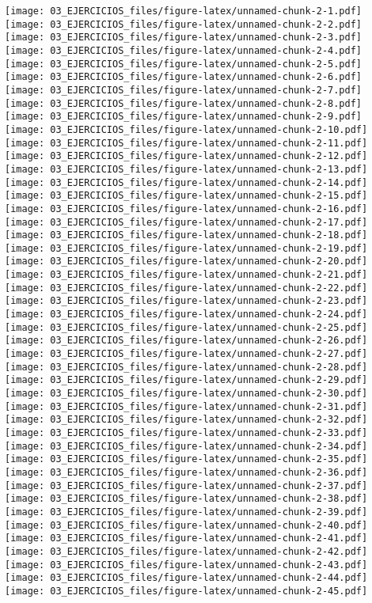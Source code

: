 \documentclass[
]{book}
\begin{document}
\texttt{[image: 03\_EJERCICIOS\_files/figure-latex/unnamed-chunk-2-1.pdf]} \texttt{[image: 03\_EJERCICIOS\_files/figure-latex/unnamed-chunk-2-2.pdf]} \texttt{[image: 03\_EJERCICIOS\_files/figure-latex/unnamed-chunk-2-3.pdf]} \texttt{[image: 03\_EJERCICIOS\_files/figure-latex/unnamed-chunk-2-4.pdf]} \texttt{[image: 03\_EJERCICIOS\_files/figure-latex/unnamed-chunk-2-5.pdf]} \texttt{[image: 03\_EJERCICIOS\_files/figure-latex/unnamed-chunk-2-6.pdf]} \texttt{[image: 03\_EJERCICIOS\_files/figure-latex/unnamed-chunk-2-7.pdf]} \texttt{[image: 03\_EJERCICIOS\_files/figure-latex/unnamed-chunk-2-8.pdf]} \texttt{[image: 03\_EJERCICIOS\_files/figure-latex/unnamed-chunk-2-9.pdf]} \texttt{[image: 03\_EJERCICIOS\_files/figure-latex/unnamed-chunk-2-10.pdf]} \texttt{[image: 03\_EJERCICIOS\_files/figure-latex/unnamed-chunk-2-11.pdf]} \texttt{[image: 03\_EJERCICIOS\_files/figure-latex/unnamed-chunk-2-12.pdf]} \texttt{[image: 03\_EJERCICIOS\_files/figure-latex/unnamed-chunk-2-13.pdf]} \texttt{[image: 03\_EJERCICIOS\_files/figure-latex/unnamed-chunk-2-14.pdf]} \texttt{[image: 03\_EJERCICIOS\_files/figure-latex/unnamed-chunk-2-15.pdf]} \texttt{[image: 03\_EJERCICIOS\_files/figure-latex/unnamed-chunk-2-16.pdf]} \texttt{[image: 03\_EJERCICIOS\_files/figure-latex/unnamed-chunk-2-17.pdf]} \texttt{[image: 03\_EJERCICIOS\_files/figure-latex/unnamed-chunk-2-18.pdf]} \texttt{[image: 03\_EJERCICIOS\_files/figure-latex/unnamed-chunk-2-19.pdf]} \texttt{[image: 03\_EJERCICIOS\_files/figure-latex/unnamed-chunk-2-20.pdf]} \texttt{[image: 03\_EJERCICIOS\_files/figure-latex/unnamed-chunk-2-21.pdf]} \texttt{[image: 03\_EJERCICIOS\_files/figure-latex/unnamed-chunk-2-22.pdf]} \texttt{[image: 03\_EJERCICIOS\_files/figure-latex/unnamed-chunk-2-23.pdf]} \texttt{[image: 03\_EJERCICIOS\_files/figure-latex/unnamed-chunk-2-24.pdf]} \texttt{[image: 03\_EJERCICIOS\_files/figure-latex/unnamed-chunk-2-25.pdf]} \texttt{[image: 03\_EJERCICIOS\_files/figure-latex/unnamed-chunk-2-26.pdf]} \texttt{[image: 03\_EJERCICIOS\_files/figure-latex/unnamed-chunk-2-27.pdf]} \texttt{[image: 03\_EJERCICIOS\_files/figure-latex/unnamed-chunk-2-28.pdf]} \texttt{[image: 03\_EJERCICIOS\_files/figure-latex/unnamed-chunk-2-29.pdf]} \texttt{[image: 03\_EJERCICIOS\_files/figure-latex/unnamed-chunk-2-30.pdf]} \texttt{[image: 03\_EJERCICIOS\_files/figure-latex/unnamed-chunk-2-31.pdf]} \texttt{[image: 03\_EJERCICIOS\_files/figure-latex/unnamed-chunk-2-32.pdf]} \texttt{[image: 03\_EJERCICIOS\_files/figure-latex/unnamed-chunk-2-33.pdf]} \texttt{[image: 03\_EJERCICIOS\_files/figure-latex/unnamed-chunk-2-34.pdf]} \texttt{[image: 03\_EJERCICIOS\_files/figure-latex/unnamed-chunk-2-35.pdf]} \texttt{[image: 03\_EJERCICIOS\_files/figure-latex/unnamed-chunk-2-36.pdf]} \texttt{[image: 03\_EJERCICIOS\_files/figure-latex/unnamed-chunk-2-37.pdf]} \texttt{[image: 03\_EJERCICIOS\_files/figure-latex/unnamed-chunk-2-38.pdf]} \texttt{[image: 03\_EJERCICIOS\_files/figure-latex/unnamed-chunk-2-39.pdf]} \texttt{[image: 03\_EJERCICIOS\_files/figure-latex/unnamed-chunk-2-40.pdf]} \texttt{[image: 03\_EJERCICIOS\_files/figure-latex/unnamed-chunk-2-41.pdf]} \texttt{[image: 03\_EJERCICIOS\_files/figure-latex/unnamed-chunk-2-42.pdf]} \texttt{[image: 03\_EJERCICIOS\_files/figure-latex/unnamed-chunk-2-43.pdf]} \texttt{[image: 03\_EJERCICIOS\_files/figure-latex/unnamed-chunk-2-44.pdf]} \texttt{[image: 03\_EJERCICIOS\_files/figure-latex/unnamed-chunk-2-45.pdf]} 
\end{document}
